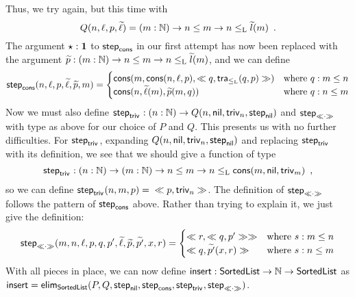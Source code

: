 \documentclass{article}
\begin{document}
\begin{example}
Thus, we try again, but this time with 
\[
Q(n, \ell, p,\stepindarg{\ell})
   = (m : \Nat) \to n \leq m \to n \lessList \stepindarg{l}(m) \enspace .
\]
The argument $\oneelt : \one$ to $\stepind{\consListbare}$ in our
first attempt has now been replaced with the argument $\stepindarg{p}
: (m : \Nat) \to n \leq m \to n \lessList \stepindarg{l}(m)$, and we can define
\[
\stepind{\consListbare}(n, \ell, p, \stepindarg{\ell}, \stepindarg{p}, m) =
\begin{cases}
  \consList{m}{\consList{n}{\ell}{p}}{\consLess{m}{n}{\ell}{p}{q}{\lessListtrans{q}{p}}} & \text{where $q : m \leq n$} \\
  \consList{n}{\stepindarg{\ell}(m)}{\stepindarg{p}(m, q)} & \text{where $q : n \leq m$} 
\end{cases}
\]
%
Now we must also define $\stepind{\nilLess{}} : (n : \Nat) \to Q(n,
\nilList, \nilLess{n}, \stepind{\nilList})$ and
$\stepind{\consLessbare}$ with type as above for our choice of $P$ and
$Q$. This presents us with no further difficulties. For
$\stepind{\nilLess{}}$, expanding $Q(n, \nilList, \nilLess{n},
\stepind{\nilList})$ and replacing $\stepind{\nilLess{}}$ with its
definition, we see that we should give a function of type
\[
\stepind{\nilLess{}} : (n : \Nat) \to (m : \Nat) \to n \leq m \to n
\lessList \consList{m}{\nilList}{\nilLess{m}} \enspace ,
\]
so we can define $\stepind{\nilLess{}}(n, m, p) = {}
\consLess{n}{m}{\nilList}{\nilLess{m}}{p}{\nilLess{n}}$. The
definition of $\stepind{\consLessbare}$ follows the pattern of $\stepind{\consListbare}$
above. Rather than trying to explain it, we just give the definition:
\[
\stepind{\consLessbare}(m, n, \ell, p, q, p', \stepindarg{\ell}, \stepindarg{p}, \stepindarg{p'}, x, r) =
\begin{cases}
  \consLess{m}{x}{\consList{n}{\ell}{p}}{\consLess{m}{n}{\ell}{p}{s}{\lessListtrans{s}{p}}}{r}{\consLess{m}{n}{\ell}{p}{q}{p'}} & \text{where $s : m \leq n$} \\
  \consLess{m}{n}{p'}{\stepindarg{p}(x, s)}{q}{\stepindarg{p'}(x, r)} & \text{where $s : n \leq m$} 
\end{cases}
\]
%
With all pieces in place, we can now define $\Listinsert : \SortedList
\to \Nat \to \SortedList$ as $\Listinsert = \elim_{\SortedList}(P, Q,
\stepind{\nilList}, \stepind{\consListbare}, \stepind{\nilLess{}},
\stepind{\consLessbare})$.
\blackqed




\end{example}
\end{document}
